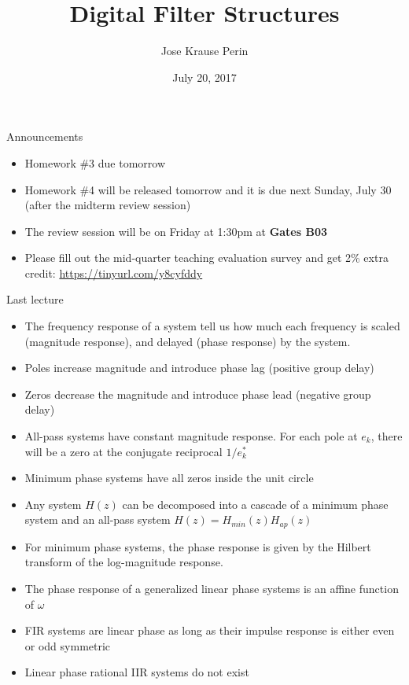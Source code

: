 \documentclass[10pt]{beamer}
\title[EE 264]{Digital Filter Structures}
\author{Jose Krause Perin}
\institute{Stanford University}
\date{July 20, 2017}
\begin{document}
\begin{frame}
  \titlepage
\end{frame}

%
\begin{frame}{Announcements}
	\begin{itemize}
		\item Homework \#3 due tomorrow
		\item Homework \#4 will be released tomorrow and it is due next Sunday, July 30 (after the midterm review session)
		\item The review session will be on Friday at 1:30pm at \textbf{Gates B03}
		\item Please fill out the mid-quarter teaching evaluation survey and get 2\% extra credit: \url{https://tinyurl.com/y8cyfddy}
	\end{itemize}
\end{frame}

%
\begin{frame}{Last lecture}
	\begin{itemize}
		\item The frequency response of a system tell us how much each frequency is scaled (magnitude response), and delayed (phase response) by the system.
		\item Poles increase magnitude and introduce phase lag (positive group delay)
		\item Zeros decrease the magnitude and introduce phase lead (negative group delay)
		\item All-pass systems have constant magnitude response. For each pole at $e_k$, there will be a zero at the conjugate reciprocal $1/e^*_k$
		\item Minimum phase systems have all zeros inside the unit circle
		\item Any system $H(z)$ can be decomposed into a cascade of a minimum phase system and an all-pass system $H(z) = H_{min}(z)H_{ap}(z)$
		\item For minimum phase systems, the phase response is given by the Hilbert transform of the log-magnitude response. 
		\item The phase response of a generalized linear phase systems is an affine function of $\omega$
		\item FIR systems are linear phase as long as their impulse response is either even or odd symmetric
		\item Linear phase rational IIR systems do not exist
	\end{itemize}
\end{frame}
\end{document}
